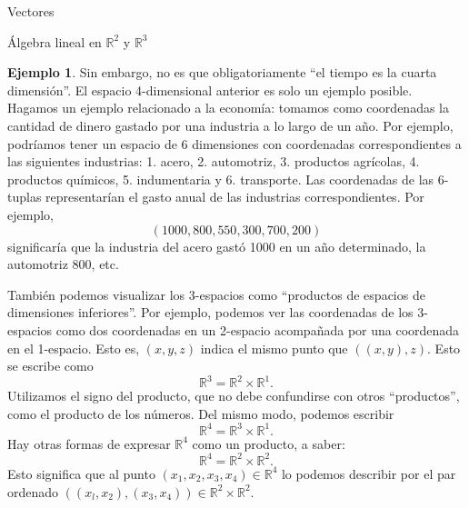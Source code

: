 \documentclass[a4paper,12pt,twoside,spanish,reqno]{amsbook}
\theoremstyle{definition}
\newtheorem{ejemplo}{Ejemplo}[section]
\theoremstyle{remark}
\newcommand{\R}{\mathbb R}
\begin{document}
\begin{chapter}{Vectores}
\begin{section}{Álgebra lineal en $\R^2$ y $\R^3$}
\begin{ejemplo}
            Sin embargo, no es que obligatoriamente ``el tiempo es la cuarta dimensión''. El espacio 4-dimensional anterior es solo un ejemplo posible. Hagamos un ejemplo relacionado a la economía: tomamos como coordenadas la cantidad de dinero gastado por una industria a lo largo de un año. 
            Por ejemplo, podríamos tener un espacio de 6 dimensiones con coordenadas correspondientes a las siguientes industrias: 1. acero, 2. automotriz, 3. productos agrícolas,  4. productos químicos, 5. indumentaria y 6. transporte. Las coordenadas de las 6-tuplas representarían el gasto anual de las industrias correspondientes. Por  ejemplo, 
            \begin{equation*}
            (1000, 800, 550, 300, 700, 200)
            \end{equation*}
            significaría que la industria del acero gastó 1000 en un año determinado, la automotriz 800, etc.
        \end{ejemplo} 

        También podemos visualizar los 3-espacios  como ``productos de espacios de dimensiones inferiores''. Por ejemplo, podemos ver las coordenadas de los 3-espacios como dos coordenadas en un 2-espacio acompañada por una coordenada en el 1-espacio. Esto es, $(x,y,z)$ indica el mismo punto que $((x,y),z)$.  Esto se escribe como 
        \begin{equation*}
            \R^3 = \R^2 \times \R^1.
        \end{equation*}
        Utilizamos el signo del producto, que no debe confundirse con otros ``productos'', como el producto de los números. Del mismo modo, podemos escribir
        \begin{equation*}
        \R^4 = \R^3 \times \R^1.
        \end{equation*}
        Hay otras formas de expresar $\R^4$ como un producto, a saber:
        \begin{equation*}
        \R^4 = \R^2 \times \R^2.
        \end{equation*}
        Esto significa que al punto $(x_1,x_2,x_3,x_4)\in \R^4$  lo podemos describir por el par ordenado $((x_l, x_2),(x_3, x_4))\in \R^2 \times \R^2$. 
        

\end{section}
\end{chapter}
\end{document}
